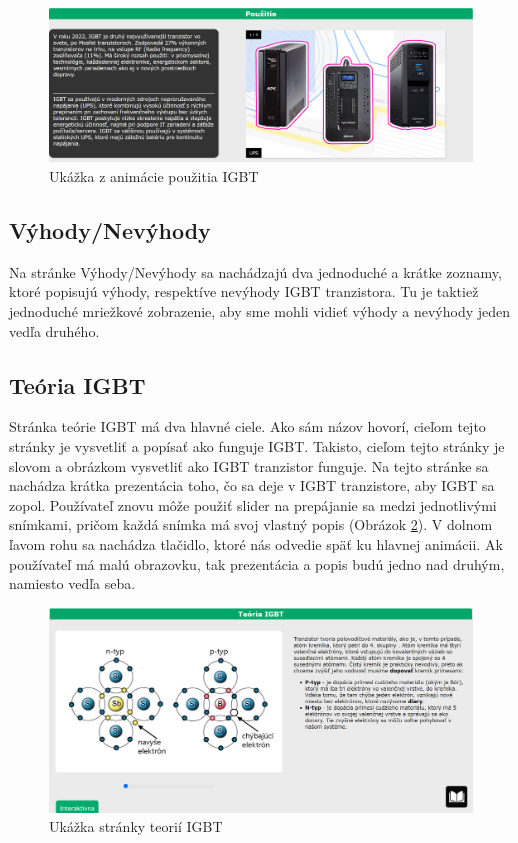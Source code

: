 \begin{figure}[!htbp]
    \centering
    \includegraphics[width=16cm]{img/app.PNG}
    \caption{Ukážka z animácie použitia IGBT}
    \label{app}
\end{figure}

\subsection{Výhody/Nevýhody}
\noindent Na stránke Výhody/Nevýhody sa nachádzajú dva jednoduché a krátke zoznamy, ktoré popisujú výhody, respektíve nevýhody \acrshort{IGBT} tranzistora. Tu je taktiež jednoduché mriežkové zobrazenie, aby sme mohli vidieť výhody a nevýhody jeden vedľa druhého.

\subsection{Teória IGBT}
\noindent Stránka teórie IGBT má dva hlavné ciele. Ako sám názov hovorí, cieľom tejto stránky je vysvetliť a popísať ako funguje IGBT. Takisto, cieľom tejto stránky je slovom a obrázkom vysvetliť ako \acrshort{IGBT} tranzistor funguje. Na tejto stránke sa nachádza krátka prezentácia toho, čo sa deje v \acrshort{IGBT} tranzistore, aby \acrshort{IGBT} sa zopol. Používateľ znovu môže použiť slider na prepájanie sa medzi jednotlivými snímkami, pričom každá snímka má svoj vlastný popis (Obrázok \ref{main}). V dolnom ľavom rohu sa nachádza tlačidlo, ktoré nás odvedie späť ku hlavnej animácii. Ak používateľ má malú obrazovku, tak prezentácia a popis budú jedno nad druhým, namiesto vedľa seba.

\begin{figure}[!htbp]
    \centering
    \includegraphics[width=16cm]{img/main.PNG}
    \caption{Ukážka stránky teorií IGBT}
    \label{main}
\end{figure}

